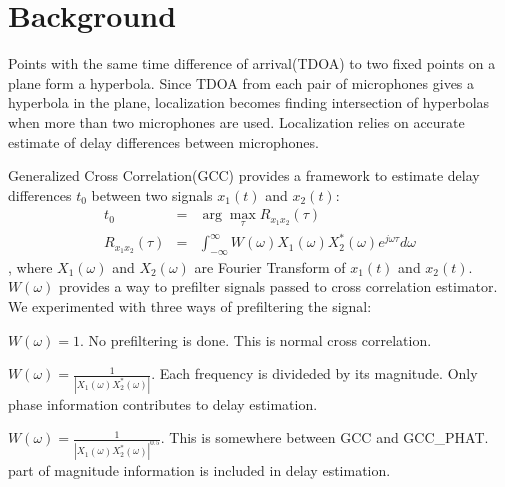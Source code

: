 \section{Background}
Points with the same time difference of arrival(TDOA) to two fixed points on a plane form a hyperbola. Since TDOA from each pair of microphones gives a hyperbola in the plane, localization becomes finding intersection of hyperbolas when more than two microphones are used. Localization relies on accurate estimate of delay differences between microphones.

Generalized Cross Correlation(GCC) provides a framework to estimate delay differences $t_0$ between two signals $x_1(t)$ and $x_2(t)$:
\begin{eqnarray} \label{eq:gcc}
t_0 &=& \arg\max_{\tau} R_{x_1x_2}(\tau) \\
R_{x_1x_2}(\tau) &=& \int_{-\infty}^\infty W(\omega) X_1(\omega) X_2^{*}(\omega) e^{j\omega\tau} d\omega
\end{eqnarray}
, where $X_1(\omega)$ and $X_2(\omega)$ are Fourier Transform of $x_1(t)$ and $x_2(t)$. $W(\omega)$ provides a way to prefilter signals passed to cross correlation estimator. We experimented with three ways of prefiltering the signal:
\begin{description}
\item[GCC] $W(\omega) = 1$. No prefiltering is done. This is normal cross correlation.
\item[GCC\_PHAT] $W(\omega) = \frac{1}{\left|X_1(\omega)X_2^{*}(\omega)\right|}$. Each frequency is divideded by its magnitude. Only phase information contributes to delay estimation.
\item[GCC\_PHAT\_SQRT] $W(\omega) = \frac{1}{\left|X_1(\omega)X_2^*(\omega)\right|^{0.5}}$. This is somewhere between GCC and GCC\_PHAT. part of magnitude information is included in delay estimation.
\end{description}
